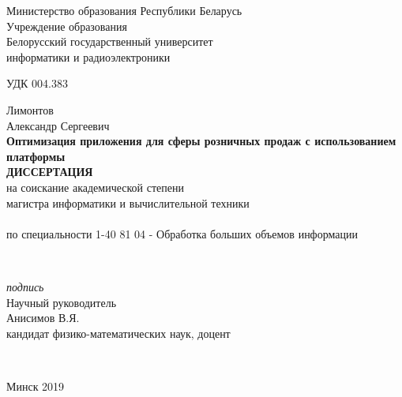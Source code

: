 \begin{titlepage}
  \begin{center}
    Министерство образования Республики Беларусь\\[1em]
    Учреждение образования\\
    Белорусский государственный университет\\ информатики и радиоэлектроники\\[2em]
  \end{center}

УДК 004.383\\[2em]

  \begin{center}
    Лимонтов\\
    Александр Сергеевич
    \\[1em]
    \textbf{Оптимизация приложения для сферы розничных продаж с использованием платформы \LB}\\[3em]
    \textbf{\large\MakeUppercase{Диссертация}}\\
    на соискание академической степени\\магистра информатики и вычислительной техники\\
    \\[1em]
    по специальности 1-40 81 04 - Обработка больших объемов информации
  \end{center}\\[2em]

  \begin{flushright}
    \begin{minipage}{0.42\textwidth}
      \textit{подпись}\\[1em]
      Научный руководитель\\
      Анисимов В.Я.\\
      кандидат физико-ма\-те\-ма\-ти\-чес\-ких наук, доцент\\
    \end{minipage}\\[2.2em]
  \end{flushright}

  \mbox{}
  \vfill
  \begin{center}Минск 2019\end{center}
\end{titlepage}
